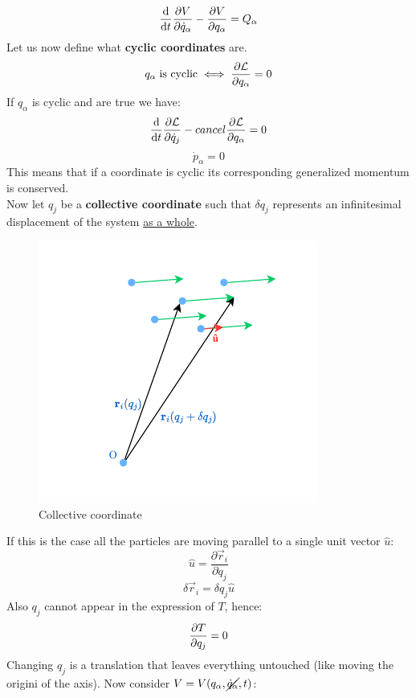 \begin{equation}
    \dv{}{t}\pdv{V}{\dot{q}_{\alpha}}-\pdv{V}{q_{\alpha}} = Q_{\alpha}
\end{equation}
Let us now define what \textbf{cyclic coordinates} are.
\begin{equation}
    q_{\alpha}\;\text{is cyclic} \iff \pdv{\lagr}{q_{\alpha}} = 0
\end{equation}
If $q_{\alpha}$ is cyclic and \eleref\;are true we have:
\begin{equation}
    \dv{}{t} \pdv{\lagr}{\dot{q}_j} - \\cancel{\pdv{\lagr}{q_{\alpha}}} = 0
\end{equation}
\begin{equation}
    \dot{p}_{\alpha} = 0
\end{equation}
This means that if a coordinate is cyclic its corresponding generalized momentum is conserved.\\
Now let $q_j$ be a \textbf{collective coordinate} such that $\delta q_j$ represents an infinitesimal displacement of the system \underline{as a whole}.
\begin{figure}[H]
    \centering
    \includegraphics[width=0.4\linewidth]{res/svg/collectivecoord.drawio}
    \caption{Collective coordinate}
\end{figure}
If this is the case all the particles are moving parallel to a single unit vector $\hat{u}$:
\begin{equation}
    \hat{u} = \dfrac{\partial \vec{r}_i}{\partial q_j}
\end{equation}
\begin{equation}
    \delta \vec{r}_i = \delta q_j \hat{u}
\end{equation}
Also $q_j$ cannot appear in the expression of $T$, hence:
\begin{equation}
    \pdv{T}{q_j}=0
\end{equation}
Changing $q_j$ is a translation that leaves everything untouched (like moving the origini of the axis). Now consider $V=V(q_{\alpha},\cancel{\dot{q}_{\alpha}},t)$:
